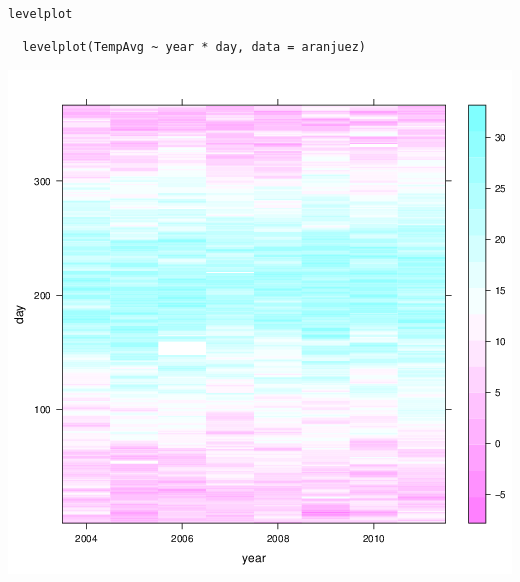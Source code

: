 \documentclass[xcolor={usenames,svgnames,dvipsnames}]{beamer}
\begin{document}
\begin{frame}[fragile,label=sec-3-34]{\texttt{levelplot}}
 \lstset{language=R,label= ,caption= ,numbers=none}
\begin{lstlisting}
  levelplot(TempAvg ~ year * day, data = aranjuez)
\end{lstlisting}
\end{frame}

\begin{frame}[label=sec-3-35]{}
\includegraphics[width=.9\linewidth]{figs/levelplot.png}
\end{frame}
\end{document}
